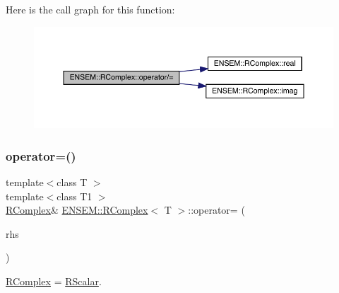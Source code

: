 Here is the call graph for this function\+:
\nopagebreak
\begin{figure}[H]
\begin{center}
\leavevmode
\includegraphics[width=350pt]{d9/d0e/classENSEM_1_1RComplex_af06d63062569441e7fc7bb532334a109_cgraph}
\end{center}
\end{figure}
\mbox{\label{classENSEM_1_1RComplex_a6553ee6381e82a410c0c531fde8e3fee}} 
\subsubsection{\texorpdfstring{operator=()}{operator=()}\hspace{0.1cm}{\footnotesize\ttfamily [1/4]}}
{\footnotesize\ttfamily template$<$class T $>$ \\
template$<$class T1 $>$ \\
\mbox{\hyperlink{classENSEM_1_1RComplex}{R\+Complex}}\& \mbox{\hyperlink{classENSEM_1_1RComplex}{E\+N\+S\+E\+M\+::\+R\+Complex}}$<$ T $>$\+::operator= (\begin{DoxyParamCaption}\item[{const \mbox{\hyperlink{classENSEM_1_1RScalar}{R\+Scalar}}$<$ T1 $>$ \&}]{rhs }\end{DoxyParamCaption})\hspace{0.3cm}{\ttfamily [inline]}}



\mbox{\hyperlink{classENSEM_1_1RComplex}{R\+Complex}} = \mbox{\hyperlink{classENSEM_1_1RScalar}{R\+Scalar}}. 

